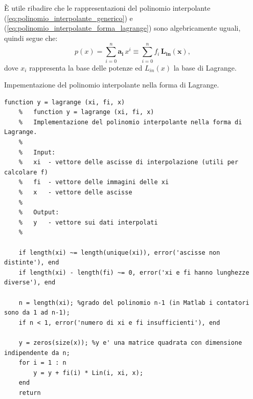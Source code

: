 \begin{remark}\label{rem:uguaglianza_polinomio_interpolante_lagrange}
	È utile ribadire che le rappresentazioni del polinomio interpolante (\ref{eq:polinomio_interpolante_generico}) e (\ref{eq:polinomio_interpolante_forma_lagrange}) sono algebricamente uguali, quindi segue che: 
	\begin{equation}\label{eq:equivalenza_basi}
		p(x)=\sum_{i=0}^n \boldsymbol{a_i}\, x^i \equiv \sum_{i=0}^n f_i\, \boldsymbol{L_{in}(x)},
	\end{equation}
	dove $x_i$ rappresenta la base delle potenze ed $L_{in}(x)$ la base di Lagrange.
\end{remark}

\begin{algorithm}
\caption{Impementazione del polinomio interpolante nella forma di Lagrange.}\label{alg:calcolo_polinomio_interpolante_forma_lagrange}
    \begin{lstlisting}[style=Matlab-editor]
    function y = lagrange (xi, fi, x)
    %   function y = lagrange (xi, fi, x)
    %   Implementazione del polinomio interpolante nella forma di Lagrange.
    %
    %   Input:
    %   xi  - vettore delle ascisse di interpolazione (utili per calcolare f)
    %   fi  - vettore delle immagini delle xi
    %   x   - vettore delle ascisse
    %
    %   Output:
    %   y   - vettore sui dati interpolati
    %
    
    if length(xi) ~= length(unique(xi)), error('ascisse non distinte'), end
    if length(xi) - length(fi) ~= 0, error('xi e fi hanno lunghezze diverse'), end
    
    n = length(xi); %grado del polinomio n-1 (in Matlab i contatori sono da 1 ad n-1);
    if n < 1, error('numero di xi e fi insufficienti'), end 
    
    y = zeros(size(x)); %y e' una matrice quadrata con dimensione indipendente da n;
    for i = 1 : n
        y = y + fi(i) * Lin(i, xi, x);
    end
    return
    \end{lstlisting}
\end{algorithm}

